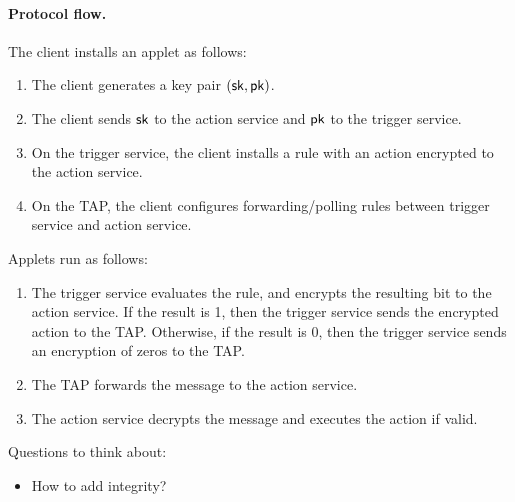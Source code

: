 \paragraph{Protocol flow.}
The client installs an applet as follows:
\begin{enumerate}[leftmargin=*]
\item The client generates a key pair $(\mathsf{sk}, \mathsf{pk})$.
\item The client sends $\mathsf{sk}$ to the action service and $\mathsf{pk}$ to the trigger
  service.
\item On the trigger service, the client installs a rule with an action
  encrypted to the action service.
\item On the TAP, the client configures forwarding/polling rules between trigger
  service and action service.
\end{enumerate}
Applets run as follows:
\begin{enumerate}[leftmargin=*]
\item The trigger service evaluates the rule, and encrypts the resulting bit to
  the action service. If the result is 1, then the trigger service sends the
  encrypted action to the TAP. Otherwise, if the result is 0, then the trigger
  service sends an encryption of zeros to the TAP.
\item The TAP forwards the message to the action service.
\item The action service decrypts the message and executes the action if valid.
\end{enumerate}
Questions to think about:
\begin{itemize}[leftmargin=*]
\item How to add integrity?
\end{itemize}
